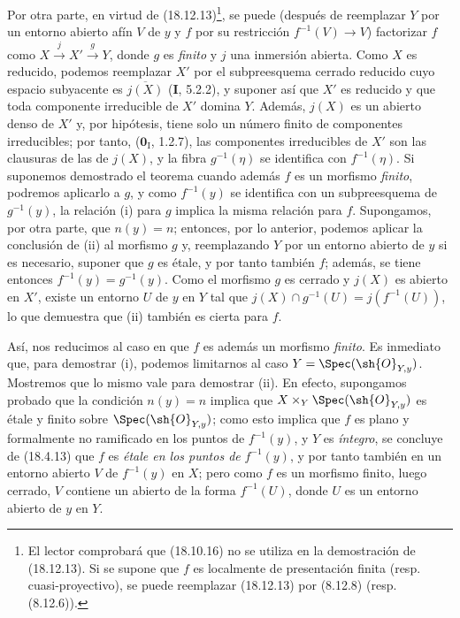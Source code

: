 Por otra parte, en virtud de (18.12.13)\footnote{El lector comprobará que (18.10.16) no se utiliza en la demostración de (18.12.13). Si se supone que $f$ es localmente de presentación finita (resp. cuasi-proyectivo), se puede reemplazar (18.12.13) por (8.12.8) (resp. (8.12.6)).}, se puede (después de reemplazar $Y$ por un entorno abierto afín $V$ de $y$ y $f$ por su restricción $f^{-1}(V)\to V$) factorizar $f$ como $X\xrightarrow{j}X'\xrightarrow{g}Y$, donde $g$ es \emph{finito} y $j$ una inmersión abierta. Como $X$ es reducido, podemos reemplazar $X'$ por el subpreesquema cerrado reducido cuyo espacio subyacente es $\overline{j(X)}$ (\textbf I, 5.2.2), y suponer así que $X'$ es reducido y que toda componente irreducible de $X'$ domina $Y$. Además, $j(X)$ es un abierto denso de $X'$ y, por hipótesis, tiene solo un número finito de componentes irreducibles; por tanto, ($\mathbf{0}_{\mathrm I}$, 1.2.7), las componentes irreducibles de $X'$ son las clausuras de las de $j(X)$, y la fibra $g^{-1}(\eta)$ se identifica con $f^{-1}(\eta)$. Si suponemos demostrado el teorema cuando además $f$ es un morfismo \emph{finito}, podremos aplicarlo a $g$, y como $f^{-1}(y)$ se identifica con un subpreesquema de $g^{-1}(y)$, la relación (i) para $g$ implica la misma relación para $f$. Supongamos, por otra parte, que $n(y)=n$; entonces, por lo anterior, podemos aplicar la conclusión de (ii) al morfismo $g$ y, reemplazando $Y$ por un entorno abierto de $y$ si es necesario, suponer que $g$ es étale, y por tanto también $f$; además, se tiene entonces $f^{-1}(y)=g^{-1}(y)$. Como el morfismo $g$ es cerrado y $j(X)$ es abierto en $X'$, existe un entorno $U$ de $y$ en $Y$ tal que $j(X)\cap g^{-1}(U)=j(f^{-1}(U))$, lo que demuestra que (ii) también es cierta para $f$.

Así, nos reducimos al caso en que $f$ es además un morfismo \emph{finito}. Es inmediato que, para demostrar (i), podemos limitarnos al caso $Y=\Spec(\sh{O}_{Y,y})$. Mostremos que lo mismo vale para demostrar (ii). En efecto, supongamos probado que la condición $n(y)=n$ implica que $X\times_Y\Spec(\sh{O}_{Y,y})$ es étale y finito sobre $\Spec(\sh{O}_{Y,y})$; como esto implica que $f$ es plano y formalmente no ramificado en los puntos de $f^{-1}(y)$, y $Y$ es \emph{íntegro}, se concluye de (18.4.13) que $f$ es \emph{étale en los puntos de} $f^{-1}(y)$, y por tanto también en un entorno abierto $V$ de $f^{-1}(y)$ en $X$; pero como $f$ es un morfismo finito, luego cerrado, $V$ contiene un abierto de la forma $f^{-1}(U)$, donde $U$ es un entorno abierto de $y$ en $Y$.

